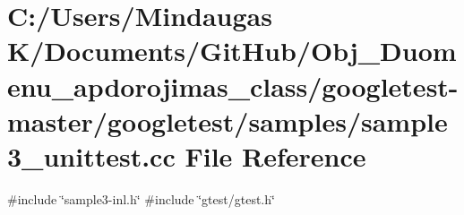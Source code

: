 \hypertarget{googletest-master_2googletest_2samples_2sample3__unittest_8cc}{}\section{C\+:/\+Users/\+Mindaugas K/\+Documents/\+Git\+Hub/\+Obj\+\_\+\+Duomenu\+\_\+apdorojimas\+\_\+class/googletest-\/master/googletest/samples/sample3\+\_\+unittest.cc File Reference}
\label{googletest-master_2googletest_2samples_2sample3__unittest_8cc}
{\ttfamily \#include \char`\"{}sample3-\/inl.\+h\char`\"{}}\newline
{\ttfamily \#include \char`\"{}gtest/gtest.\+h\char`\"{}}\newline
